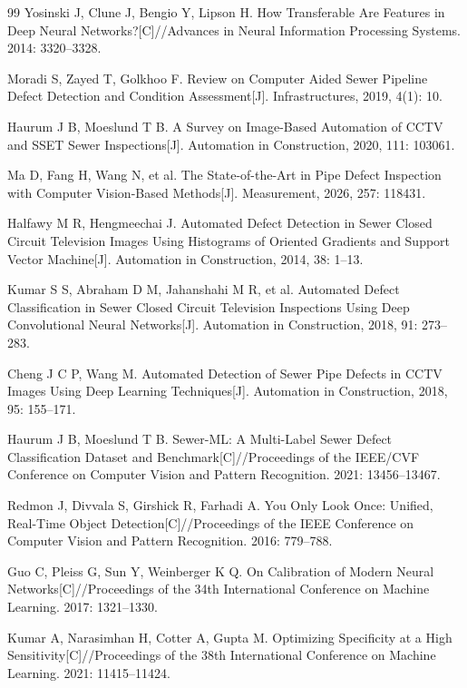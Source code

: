 \documentclass[UTF8,openany,12pt]{ctexbook}
\begin{document}
\begin{thebibliography}{99}
Yosinski J, Clune J, Bengio Y, Lipson H. How Transferable Are Features in Deep Neural Networks?[C]//Advances in Neural Information Processing Systems. 2014: 3320--3328.

Moradi S, Zayed T, Golkhoo F. Review on Computer Aided Sewer Pipeline Defect Detection and Condition Assessment[J]. Infrastructures, 2019, 4(1): 10.

Haurum J B, Moeslund T B. A Survey on Image-Based Automation of CCTV and SSET Sewer Inspections[J]. Automation in Construction, 2020, 111: 103061.

Ma D, Fang H, Wang N, et al. The State-of-the-Art in Pipe Defect Inspection with Computer Vision-Based Methods[J]. Measurement, 2026, 257: 118431.

Halfawy M R, Hengmeechai J. Automated Defect Detection in Sewer Closed Circuit Television Images Using Histograms of Oriented Gradients and Support Vector Machine[J]. Automation in Construction, 2014, 38: 1--13.

Kumar S S, Abraham D M, Jahanshahi M R, et al. Automated Defect Classification in Sewer Closed Circuit Television Inspections Using Deep Convolutional Neural Networks[J]. Automation in Construction, 2018, 91: 273--283.

Cheng J C P, Wang M. Automated Detection of Sewer Pipe Defects in CCTV Images Using Deep Learning Techniques[J]. Automation in Construction, 2018, 95: 155--171.

Haurum J B, Moeslund T B. Sewer-ML: A Multi-Label Sewer Defect Classification Dataset and Benchmark[C]//Proceedings of the IEEE/CVF Conference on Computer Vision and Pattern Recognition. 2021: 13456--13467.

Redmon J, Divvala S, Girshick R, Farhadi A. You Only Look Once: Unified, Real-Time Object Detection[C]//Proceedings of the IEEE Conference on Computer Vision and Pattern Recognition. 2016: 779--788.

Guo C, Pleiss G, Sun Y, Weinberger K Q. On Calibration of Modern Neural Networks[C]//Proceedings of the 34th International Conference on Machine Learning. 2017: 1321--1330.

Kumar A, Narasimhan H, Cotter A, Gupta M. Optimizing Specificity at a High Sensitivity[C]//Proceedings of the 38th International Conference on Machine Learning. 2021: 11415--11424.


\end{thebibliography}
\end{document}
